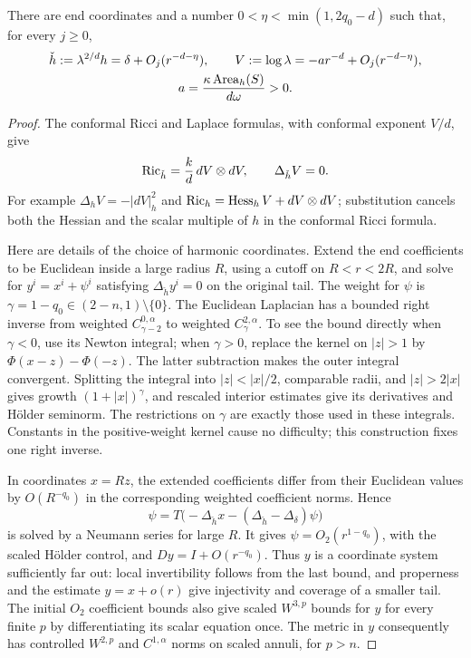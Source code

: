 \begin{proposition}
\label{prop:static:harmonic-end}
There are end coordinates and a number
$0<\eta<\min(1,2q_0-d)$ such that, for every $j\ge0$,
\begin{equation}
 \begin{gathered}
 \check h:=\lambda^{2/d}h
       =\delta+O_j(r^{-d-\eta}),\qquad
 V:=\log\lambda=-a r^{-d}+O_j(r^{-d-\eta}),\\
 a=\frac{\kappa\operatorname{Area}_h(S)}{d\omega}>0.
 \end{gathered}
 \label{eq:static:harmonic-end}
\end{equation}
\end{proposition}

\begin{proof}
The conformal Ricci and Laplace formulas, with conformal exponent
$V/d$, give
\begin{equation}
 \operatorname{Ric}_{\check h}=\frac{k}{d}\,dV\otimes dV,
 \qquad \Delta_{\check h}V=0.
 \label{eq:static:optical-system}
\end{equation}
For example $\Delta_hV=-|dV|_h^2$ and
$\operatorname{Ric}_h=\operatorname{Hess}_hV+dV\otimes dV$; substitution cancels both the
Hessian and the scalar multiple of $h$ in the conformal Ricci formula.

Here are details of the choice of harmonic coordinates.  Extend the
end coefficients to be Euclidean inside a large radius $R$, using a
cutoff on $R<r<2R$, and solve for $y^i=x^i+\psi^i$ satisfying
$\Delta_{\check h}y^i=0$ on the original tail.  The weight for $\psi$
is $\gamma=1-q_0\in(2-n,1)\setminus\{0\}$.  The Euclidean Laplacian
has a bounded right inverse from weighted $C^{0,\alpha}_{\gamma-2}$
to weighted $C^{2,\alpha}_\gamma$.  To see the bound directly when
$\gamma<0$, use its Newton integral; when $\gamma>0$, replace the
kernel on $|z|>1$ by $\Phi(x-z)-\Phi(-z)$.  The latter subtraction
makes the outer integral convergent.  Splitting the integral into
$|z|<|x|/2$, comparable radii, and $|z|>2|x|$ gives growth
$(1+|x|)^\gamma$, and rescaled interior estimates give its derivatives
and H\"older seminorm.  The restrictions on $\gamma$ are exactly those
used in these integrals.  Constants in the positive-weight kernel
cause no difficulty; this construction fixes one right inverse.

In coordinates $x=Rz$, the extended coefficients differ from their
Euclidean values by $O(R^{-q_0})$ in the corresponding weighted
coefficient norms.  Hence
\[
 \psi=T\bigl(-\Delta_{\check h}x
                 -(\Delta_{\check h}-\Delta_\delta)\psi\bigr)
\]
is solved by a Neumann series for large $R$.  It gives
$\psi=O_2(r^{1-q_0})$, with the scaled H\"older control, and
$Dy=I+O(r^{-q_0})$.  Thus $y$ is a coordinate system sufficiently far
out: local invertibility follows from the last bound, and properness
and the estimate $y=x+o(r)$ give injectivity and coverage of a smaller
tail.  The initial $O_2$ coefficient bounds also give scaled
$W^{3,p}$ bounds for $y$ for every finite $p$ by differentiating its
scalar equation once.  The metric in $y$ consequently has controlled
$W^{2,p}$ and $C^{1,\alpha}$ norms on scaled annuli, for $p>n$.


\end{proof}
